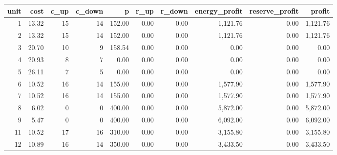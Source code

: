 \begin{tabular}{rrrrrrrrrr}
\toprule
unit & cost & c\_up & c\_down & p & r\_up & r\_down & energy\_profit & reserve\_profit & profit \\
\midrule
1 & 13.32 & 15 & 14 & 152.00 & 0.00 & 0.00 & 1,121.76 & 0.00 & 1,121.76 \\
2 & 13.32 & 15 & 14 & 152.00 & 0.00 & 0.00 & 1,121.76 & 0.00 & 1,121.76 \\
3 & 20.70 & 10 & 9 & 158.54 & 0.00 & 0.00 & 0.00 & 0.00 & 0.00 \\
4 & 20.93 & 8 & 7 & 0.00 & 0.00 & 0.00 & 0.00 & 0.00 & 0.00 \\
5 & 26.11 & 7 & 5 & 0.00 & 0.00 & 0.00 & 0.00 & 0.00 & 0.00 \\
6 & 10.52 & 16 & 14 & 155.00 & 0.00 & 0.00 & 1,577.90 & 0.00 & 1,577.90 \\
7 & 10.52 & 16 & 14 & 155.00 & 0.00 & 0.00 & 1,577.90 & 0.00 & 1,577.90 \\
8 & 6.02 & 0 & 0 & 400.00 & 0.00 & 0.00 & 5,872.00 & 0.00 & 5,872.00 \\
9 & 5.47 & 0 & 0 & 400.00 & 0.00 & 0.00 & 6,092.00 & 0.00 & 6,092.00 \\
11 & 10.52 & 17 & 16 & 310.00 & 0.00 & 0.00 & 3,155.80 & 0.00 & 3,155.80 \\
12 & 10.89 & 16 & 14 & 350.00 & 0.00 & 0.00 & 3,433.50 & 0.00 & 3,433.50 \\
\bottomrule
\end{tabular}
